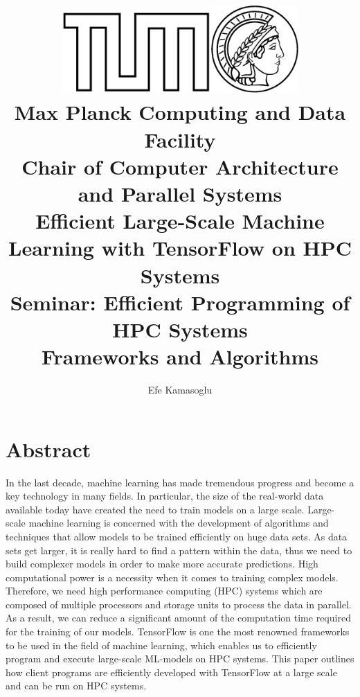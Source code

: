 \documentclass[ieeetran]{article}
\title{\includegraphics[width=0.43\textwidth]{tumlogo}\hspace{2ex}\includegraphics[width=0.25\textwidth]{maxlogo}\vspace{1ex}\\ \large \textbf{Max Planck Computing and Data Facility \\Chair of Computer Architecture and Parallel Systems} \vspace{10ex}\\ \huge Efficient Large-Scale Machine Learning with TensorFlow on HPC Systems \vspace{6ex}\\
\large Seminar: Efficient Programming of HPC Systems \\Frameworks and Algorithms\vspace{15ex}}
\author{Efe Kamasoglu}
\begin{document}
\maketitle

\pagebreak

\tableofcontents

\pagebreak


\section*{Abstract}
In the last decade, machine learning has made tremendous progress and become a key technology in many fields. In particular, the size of the real-world data available today have created the need to train models on a large scale. Large-scale machine learning is concerned with the development of algorithms and techniques that allow models to be trained efficiently on huge data sets. As data sets get larger, it is really hard to find a pattern within the data, thus we need to build complexer models in order to make more accurate predictions. High computational power is a necessity when it comes to training complex models. Therefore, we need high performance computing (HPC) systems which are composed of multiple processors and storage units to process the data in parallel. As a result, we can reduce a significant amount of the computation time required for the training of our models. TensorFlow is one the most renowned frameworks to be used in the field of machine learning, which enables us to efficiently program and execute large-scale ML-models on HPC systems. This paper outlines how client programs are efficiently developed with TensorFlow at a large scale and can be run on HPC systems.

\pagebreak
\end{document}

